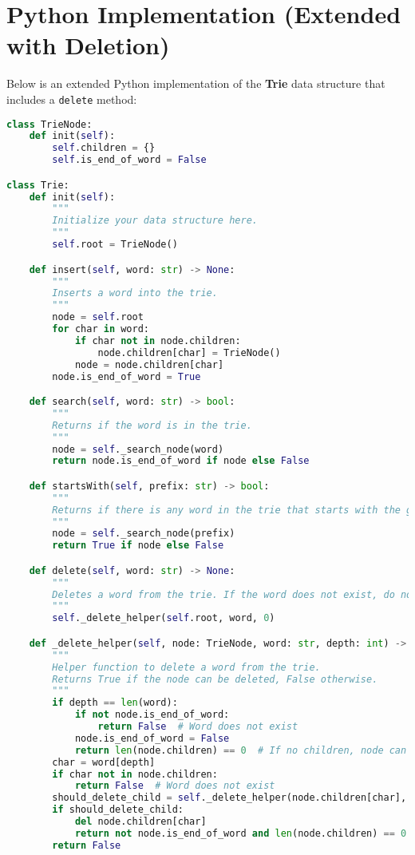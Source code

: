 \section*{Python Implementation (Extended with Deletion)}


Below is an extended Python implementation of the \textbf{Trie} data structure that includes a \texttt{delete} method:

\begin{fullwidth}
\begin{lstlisting}[language=Python]
class TrieNode:
    def init(self):
        self.children = {}
        self.is_end_of_word = False

class Trie:
    def init(self):
        """
        Initialize your data structure here.
        """
        self.root = TrieNode()

    def insert(self, word: str) -> None:
        """
        Inserts a word into the trie.
        """
        node = self.root
        for char in word:
            if char not in node.children:
                node.children[char] = TrieNode()
            node = node.children[char]
        node.is_end_of_word = True

    def search(self, word: str) -> bool:
        """
        Returns if the word is in the trie.
        """
        node = self._search_node(word)
        return node.is_end_of_word if node else False

    def startsWith(self, prefix: str) -> bool:
        """
        Returns if there is any word in the trie that starts with the given prefix.
        """
        node = self._search_node(prefix)
        return True if node else False

    def delete(self, word: str) -> None:
        """
        Deletes a word from the trie. If the word does not exist, do nothing.
        """
        self._delete_helper(self.root, word, 0)

    def _delete_helper(self, node: TrieNode, word: str, depth: int) -> bool:
        """
        Helper function to delete a word from the trie.
        Returns True if the node can be deleted, False otherwise.
        """
        if depth == len(word):
            if not node.is_end_of_word:
                return False  # Word does not exist
            node.is_end_of_word = False
            return len(node.children) == 0  # If no children, node can be deleted
        char = word[depth]
        if char not in node.children:
            return False  # Word does not exist
        should_delete_child = self._delete_helper(node.children[char], word, depth + 1)
        if should_delete_child:
            del node.children[char]
            return not node.is_end_of_word and len(node.children) == 0
        return False


\end{lstlisting}
\end{fullwidth}
